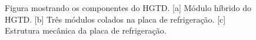 \begin{figure}
    \centering
    \label{hgtd}
    \caption{Figura mostrando os componentes do HGTD. [a] Módulo híbrido do HGTD. [b] Três módulos colados na placa de refrigeração. [c] Estrutura mecânica da placa de refrigeração.}
\end{figure}
\thispagestyle{plain}
\renewcommand{\cleardoublepage}{}
\renewcommand{\clearpage}{}